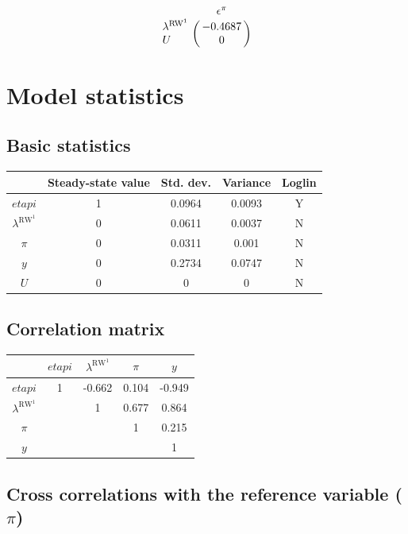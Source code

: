 $$\bordermatrix{
~ & \epsilon^{\pi} \cr
\lambda^{\mathrm{RW}^{\mathrm{1}}} & -0.4687 \cr
U & 0 \cr
}$$


\section{Model statistics}

\subsection{Basic statistics}

\begin{tabular}{c|c|c|c|c|}
  & Steady-state value & Std. dev. & Variance & Loglin\\
\hline
${e\!t\!a\!p\!i}$ & 1 & 0.0964 & 0.0093 & Y    \\
$\lambda^{\mathrm{RW}^{\mathrm{1}}}$ & 0 & 0.0611 & 0.0037 & N    \\
$\pi$ & 0 & 0.0311 & 0.001 & N    \\
$y$ & 0 & 0.2734 & 0.0747 & N    \\
$U$ & 0 & 0 & 0 & N    \\
\hline
\end{tabular}


\subsection{Correlation matrix}

\begin{tabular}{c|cccc|}
  & ${e\!t\!a\!p\!i}$ & $\lambda^{\mathrm{RW}^{\mathrm{1}}}$ & $\pi$ & $y$\\
\hline
${e\!t\!a\!p\!i}$ & 1 & -0.662 & 0.104 & -0.949 \\
$\lambda^{\mathrm{RW}^{\mathrm{1}}}$ &  & 1 & 0.677 & 0.864 \\
$\pi$ &  &  & 1 & 0.215 \\
$y$ &  &  &  & 1 \\
\hline
\end{tabular}


\subsection{Cross correlations with the reference variable ($\pi$)}

